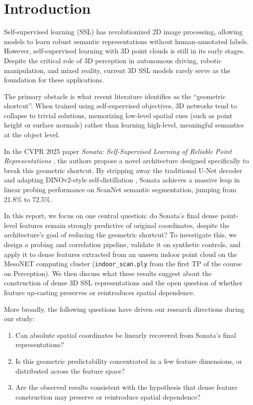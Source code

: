 \documentclass[11pt, a4paper]{article}
\begin{document}
\setcounter{page}{1}   %

\section{Introduction} 

Self-supervised learning (SSL) has revolutionized 2D image processing, allowing models to learn robust semantic representations without human-annotated labels. However, self-supervised learning with 3D point clouds is still in its early stages. Despite the critical role of 3D perception in autonomous driving, robotic manipulation, and mixed reality, current 3D SSL models rarely serve as the foundation for these applications.

The primary obstacle is what recent literature identifies as the ``geometric shortcut''. When trained using self-supervised objectives, 3D networks tend to collapse to trivial solutions, memorizing low-level spatial cues (such as point height or surface normals) rather than learning high-level, meaningful semantics at the object level. 

In the CVPR 2025 paper \textit{Sonata: Self-Supervised Learning of Reliable Point Representations} \cite{sonata2025}, the authors propose a novel architecture designed specifically to break this geometric shortcut. By stripping away the traditional U-Net decoder and adapting DINOv2-style self-distillation \cite{dinov2}, Sonata achieves a massive leap in linear probing performance on ScanNet semantic segmentation, jumping from 21.8\% to 72.5\%. 

In this report, we focus on one central question: do Sonata's final dense point-level features remain strongly predictive of original coordinates, despite the architecture's goal of reducing the geometric shortcut? To investigate this, we design a probing and correlation pipeline, validate it on synthetic controls, and apply it to dense features extracted from an unseen indoor point cloud on the MesoNET computing cluster (\texttt{indoor\_scan.ply} from the first TP of the course on Perception). We then discuss what these results suggest about the construction of dense 3D SSL representations and the open question of whether feature up-casting preserves or reintroduces spatial dependence.

More broadly, the following questions have driven our research directions during our study:
\begin{enumerate}
    \item Can absolute spatial coordinates be linearly recovered from Sonata's final representations?
    \item Is this geometric predictability concentrated in a few feature dimensions, or distributed across the feature space?
    \item Are the observed results consistent with the hypothesis that dense feature construction may preserve or reintroduce spatial dependence?
\end{enumerate}
\end{document}
